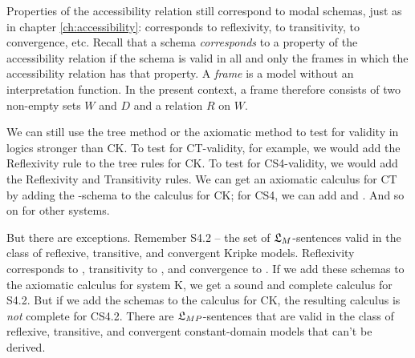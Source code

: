 Properties of the accessibility relation still correspond to modal schemas, just
as in chapter \ref{ch:accessibility}:  corresponds to reflexivity, 
to transitivity,  to convergence, etc. Recall that a schema
\emph{corresponds} to a property of the accessibility relation if the schema is
valid in all and only the frames in which the accessibility relation has that
property. A \emph{frame} is a model without an interpretation function. In the
present context, a frame therefore consists of two non-empty sets $W$ and $D$ and a
relation $R$ on $W$.

We can still use the tree method or the axiomatic method to test for validity in
logics stronger than CK. To test for CT-validity, for example, we would add the
Reflexivity rule to the tree rules for CK. To test for CS4-validity, we would
add the Reflexivity and Transitivity rules. We can get an axiomatic calculus for
CT by adding the -schema to the calculus for CK; for CS4, we can add
 and . And so on for other systems.

But there are exceptions. Remember S4.2 -- the set of $\mathfrak{L}_M$-sentences valid in
the class of reflexive, transitive, and convergent Kripke models. Reflexivity
corresponds to , transitivity to , and convergence to . If we
add these schemas to the axiomatic calculus for system K, we get a sound and
complete calculus for S4.2. But if we add the schemas to the calculus for CK,
the resulting calculus is \emph{not} complete for CS4.2. There are
$\mathfrak{L}_{MP}$-sentences that are valid in the class of reflexive, transitive, and
convergent constant-domain models that can't be derived.

%
%
%
%


